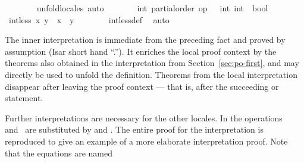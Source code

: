 \begin{isabellebody}
\ \ \ \ \ \ \isamarkupfalse%
\ unfold{}locales\ auto\isanewline
\ \ \ \ \isamarkupfalse%
\ \isamarkupfalse%
\ int{}\ partial{}order\ {}op\ {}\ {}{}\ {}int{}\ int{}\ {}\ bool{}\ \isamarkupfalse%
\isanewline
\ \ \ \ \isamarkupfalse%
\ {}int{}less\ x\ y\ {}\ {}x\ {}\ y{}{}\isanewline
\ \ \ \ \ \ \isamarkupfalse%
\ int{}less{}def\ \isamarkupfalse%
\ auto\isanewline
\ \ \isamarkupfalse%
%
\endisatagvisible
{\isafoldvisible}%
%
\isadelimvisible
%
\endisadelimvisible
%
\begin{isamarkuptext}%
The inner interpretation is immediate from the preceding fact
  and proved by assumption (Isar short hand ``.'').  It enriches the
  local proof context by the theorems
  also obtained in the interpretation from Section~\ref{sec:po-first},
  and  may directly be used to unfold the
  definition.  Theorems from the local interpretation disappear after
  leaving the proof context --- that is, after the succeeding
   or  statement.%
\end{isamarkuptext}%
\isamarkuptrue%
%
\isamarkuptrue%
%
\begin{isamarkuptext}%
Further interpretations are necessary for
  the other locales.  In  the operations~
  and~ are substituted by 
  and .  The entire proof for the
  interpretation is reproduced to give an example of a more
  elaborate interpretation proof.  Note that the equations are named

\end{isamarkuptext}
\end{isabellebody}
